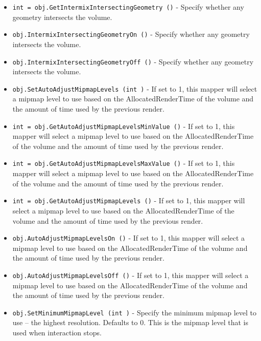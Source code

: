 \begin{itemize}
\item  \verb|int = obj.GetIntermixIntersectingGeometry ()| -  Specify whether any geometry intersects the volume.

\item  \verb|obj.IntermixIntersectingGeometryOn ()| -  Specify whether any geometry intersects the volume.

\item  \verb|obj.IntermixIntersectingGeometryOff ()| -  Specify whether any geometry intersects the volume.

\item  \verb|obj.SetAutoAdjustMipmapLevels (int )| -  If set to 1, this mapper will select a mipmap level to use based
 on the AllocatedRenderTime of the volume and the amount of time used
 by the previous render.

\item  \verb|int = obj.GetAutoAdjustMipmapLevelsMinValue ()| -  If set to 1, this mapper will select a mipmap level to use based
 on the AllocatedRenderTime of the volume and the amount of time used
 by the previous render.

\item  \verb|int = obj.GetAutoAdjustMipmapLevelsMaxValue ()| -  If set to 1, this mapper will select a mipmap level to use based
 on the AllocatedRenderTime of the volume and the amount of time used
 by the previous render.

\item  \verb|int = obj.GetAutoAdjustMipmapLevels ()| -  If set to 1, this mapper will select a mipmap level to use based
 on the AllocatedRenderTime of the volume and the amount of time used
 by the previous render.

\item  \verb|obj.AutoAdjustMipmapLevelsOn ()| -  If set to 1, this mapper will select a mipmap level to use based
 on the AllocatedRenderTime of the volume and the amount of time used
 by the previous render.

\item  \verb|obj.AutoAdjustMipmapLevelsOff ()| -  If set to 1, this mapper will select a mipmap level to use based
 on the AllocatedRenderTime of the volume and the amount of time used
 by the previous render.

\item  \verb|obj.SetMinimumMipmapLevel (int )| -  Specify the minimum mipmap level to use -- the highest resolution.
 Defaults to 0. This is the mipmap level that is used when interaction
 stops.


\end{itemize}
